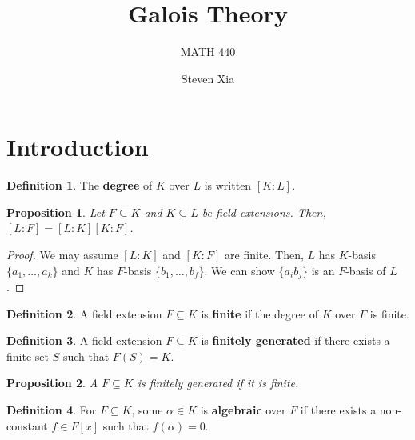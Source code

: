\documentclass[
    parskip=half,
    toc=flat,
    toc=sectionentrydotfill,
]{scrartcl}  %
\title{Galois Theory}
\subtitle{MATH 440}
\author{Steven Xia}
\theoremstyle{definition}
\newtheorem{definition}{Definition}[section]
\theoremstyle{plain}
\newtheorem{proposition}{Proposition}[section]
\theoremstyle{remark}
\begin{document}
\maketitle

\begin{minipage}{\textwidth} %
\begin{quote} 
\end{quote}
\end{minipage}

\tableofcontents


\section{Introduction}

\begin{definition}
    The \textbf{degree} of $K$ over $L$ is written $[K:L]$.
\end{definition}

\begin{proposition}
    Let $F\subseteq K$ and $K\subseteq L$ be field extensions.
    Then, $[L:F]=[L:K][K:F]$.
\end{proposition}

\begin{proof}
    We may assume $[L:K]$ and $[K:F]$ are finite.
    Then, $L$ has $K$-basis $\{a_1,\dots,a_k\}$ and $K$ has $F$-basis $\{b_1,\dots,b_f\}$.
    We can show $\{a_ib_j\}$ is an $F$-basis of $L$.
\end{proof}

\begin{definition}
    A field extension $F\subseteq K$ is \textbf{finite} if the degree of $K$
    over $F$ is finite.
\end{definition}

\begin{definition}
    A field extension $F\subseteq K$ is \textbf{finitely generated} if there
    exists a finite set $S$ such that $F(S)=K$.
\end{definition}

\begin{proposition}
    \label{prop: finite implies finitely generated}
    A $F\subseteq K$ is finitely generated if it is finite.
\end{proposition}

\begin{definition}
    For $F\subseteq K$, some $\alpha\in K$ is \textbf{algebraic} over $F$ if
    there exists a non-constant $f\in F[x]$ such that $f(\alpha)=0$.
\end{definition}
\end{document}
